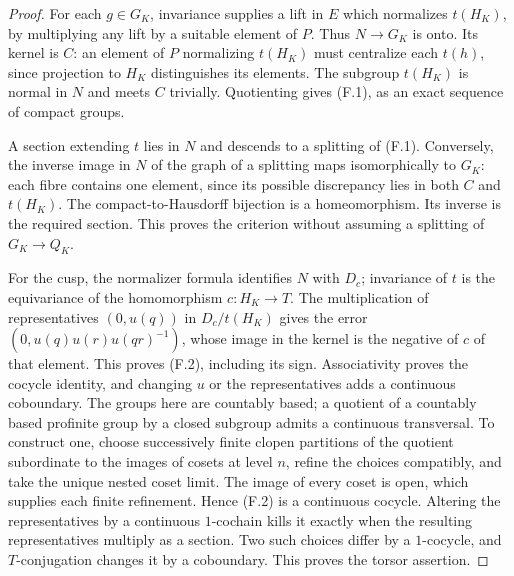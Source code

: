\documentclass[11pt,oneside]{article}
\begin{document}
\begin{proof}
For each $g\in G_K$, invariance supplies a lift in $E$ which
normalizes $t(H_K)$, by multiplying any lift by a suitable element
of $P$. Thus $N\to G_K$ is onto. Its kernel is $C$: an element of
$P$ normalizing $t(H_K)$ must centralize each $t(h)$, since
projection to $H_K$ distinguishes its elements. The subgroup
$t(H_K)$ is normal in $N$ and meets $C$ trivially. Quotienting
gives (F.1), as an exact sequence of compact groups.

A section extending $t$ lies in $N$ and descends to a splitting
of (F.1). Conversely, the inverse image in $N$ of the graph of a
splitting maps isomorphically to $G_K$: each fibre contains one
element, since its possible discrepancy lies in both $C$ and
$t(H_K)$. The compact-to-Hausdorff bijection is a homeomorphism.
Its inverse is the required section. This proves the criterion
without assuming a splitting of $G_K\to Q_K$.

For the cusp, the normalizer formula identifies $N$ with $D_c$;
invariance of $t$ is the equivariance of the homomorphism
$c:H_K\to T$. The multiplication of representatives
$(0,u(q))$ in $D_c/t(H_K)$ gives the error
$(0,u(q)u(r)u(qr)^{-1})$, whose image in the kernel is the negative
of $c$ of that element. This proves (F.2), including its sign.
Associativity proves the cocycle identity, and changing $u$ or
the representatives adds a continuous coboundary. The groups here
are countably based; a quotient of a countably based profinite
group by a closed subgroup admits a continuous transversal. To
construct one, choose successively finite clopen partitions of
the quotient subordinate to the images of cosets at level $n$,
refine the choices compatibly, and take the unique nested coset
limit. The image of every coset is open, which supplies each
finite refinement. Hence (F.2) is a continuous cocycle. Altering
the representatives by a continuous $1$-cochain kills it exactly
when the resulting representatives multiply as a section.
Two such choices differ by a $1$-cocycle, and $T$-conjugation
changes it by a coboundary. This proves the torsor assertion.
\end{proof}
\end{document}
